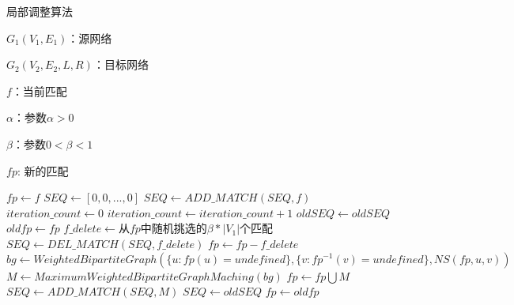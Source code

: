 \begin{small}
\begin{algorithm}[!htb]
{
\caption{局部调整算法}
\label{alg:1}
    \begin{algorithmic}[1]
    \Require
    $G_1(V_1,E_1)$：源网络
    
    $G_2(V_2,E_2,L,R)$：目标网络
    
    $f$：当前匹配
    
    $\alpha$：参数$\alpha>0$
    
    $\beta$：参数$0<\beta<1$
    
    \Ensure
    $fp$: 新的匹配
    
    \State $fp \gets f$
    \State $SEQ \gets [0,0,...,0]$
    \State $SEQ \gets ADD\_MATCH(SEQ,f)$
    \State $iteration\_count \gets 0$
        \State $iteration\_count\gets iteration\_count+1$
        \State $oldSEQ\gets oldSEQ$
        \State $oldfp\gets fp$
        \State $f\_delete\gets$从$fp$中随机挑选的$\beta*|V_1|$个匹配
        \State $SEQ\gets DEL\_MATCH(SEQ,f\_delete)$
        \State $fp \gets fp-f\_delete$
        \State $bg\gets WeightedBipartiteGraph(\{u:fp(u)=undefined\},\{v:fp^{-1}(v)=undefined\},NS(fp,u,v))$
        \State $M\gets MaximumWeightedBipartiteGraphMaching(bg)$
        \State $fp\gets fp\bigcup M$
        \State $SEQ\gets ADD\_MATCH(SEQ,M)$
            \State $SEQ\gets oldSEQ$
            \State $fp\gets oldfp$
        \EndIf
    \EndWhile
    \end{algorithmic}    
}
\end{algorithm}
\end{small}


